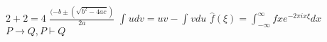 $2+2=4$
$\frac{(-b \pm(\sqrt{b^2-4ac})}{2a}$
$\int_{}^{}udv = uv - \int_{}^{}vdu$
$\hat{f}(\xi)=\int_{-\infty}^{\infty}fxe^{-2\pi ix\xi}dx$
$P\rightarrow Q, P\vdash Q$
